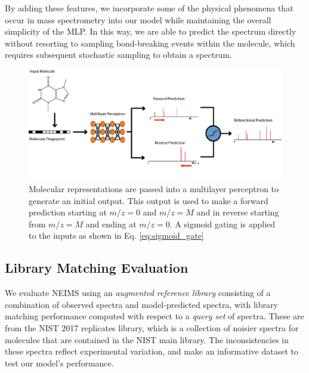 \documentclass{article}
\begin{document}
By adding these features, we incorporate some of the physical phenomena that occur in mass spectrometry into our model while maintaining the overall simplicity of the MLP. In this way, we are able to predict the spectrum directly without resorting to sampling bond-breaking events within the molecule, which requires subsequent stochastic sampling to obtain a spectrum.


\begin{figure}[ht]
    \centering
    \includegraphics[width=0.9\linewidth]{./Model_prediction.png}
    \caption[Neural Electron Ionization MS Prediction Model]{Molecular representations are passed into a multilayer perceptron to generate an initial output. This output is used to make a forward prediction starting at $\textit{m/z}=0$ and $\textit{m/z}=M$ and in reverse starting from $\textit{m/z}=M$ and ending at $\textit{m/z}=0$. A sigmoid gating is applied to the inputs as shown in Eq. \ref{eq:sigmoid_gate}}
    \label{fig:model_prediction}
\end{figure}


\subsection{Library Matching Evaluation}\label{sec:library_matching_description}

We evaluate NEIMS using an \textit{augmented reference library} consisting of a combination of observed spectra and model-predicted spectra, with library matching performance computed with respect to a \textit{query set} of spectra. These are from the NIST 2017 replicates library, which is a collection of noisier spectra for molecules that are contained in the NIST main library. The inconsistencies in these spectra reflect experimental variation, and make an informative dataset to test our model's performance.
\end{document}
